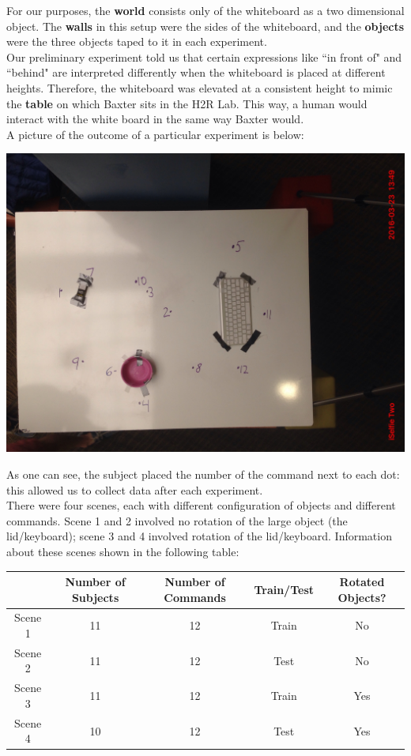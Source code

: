 \documentclass[12pt,letterpaper]{article}
\newcommand\tab[1][1cm]{\hspace*{#1}}
\begin{document}
For our purposes, the \textbf{world} consists only of the whiteboard as a two dimensional object. The \textbf{walls} in this setup were the sides of the whiteboard, and the \textbf{objects} were the three objects taped to it in each experiment.\\
\tab Our preliminary experiment told us that certain expressions like ``in front of" and ``behind" are interpreted differently when the whiteboard is placed at different heights. Therefore, the whiteboard was elevated at a consistent height to mimic the \textbf{table} on which Baxter sits in the H2R Lab. This way, a human would interact with the white board in the same way Baxter would.\\
\tab A picture of the outcome of a particular experiment is below:
\begin{center}
\includegraphics[scale=.1]{"images/scene1"}
\end{center}
As one can see, the subject placed the number of the command next to each dot: this allowed us to collect data after each experiment.\\ 
\tab There were four scenes, each with different configuration of objects and different commands. Scene 1 and 2 involved no rotation of the large object (the lid/keyboard); scene 3 and 4 involved rotation of the lid/keyboard. Information about these scenes shown in the following table: \\


\begin{tabular}{c c c c c}

 & Number of Subjects & Number of Commands & Train/Test & Rotated Objects?\\
\hline
Scene 1 & 11 & 12 & Train & No\\
Scene 2 & 11 & 12 & Test & No\\
Scene 3 & 11 & 12 & Train & Yes\\
Scene 4 & 10 & 12 & Test & Yes
\end{tabular}
\end{document}
